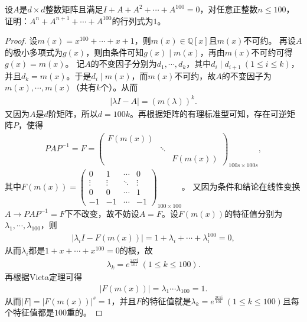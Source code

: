 \documentclass[../../main.tex]{subfiles}
\begin{document}
\begin{example}
设$A$是$d\times d$整数矩阵且满足$I + A + A^2 + \cdots + A^{100} = 0$，对任意正整数$n \leqslant  100$，证明：$A^n + A^{n + 1} + \cdots + A^{100}$的行列式为$1$。 
\end{example}
\begin{proof}
设$m(x) = x^{100}+\cdots + x + 1$，则$m(x)\in \mathbb{Q}[x]$且$m(x)$不可约。
再设$A$的极小多项式为$g(x)$，则由条件可知$g(x)\mid m(x)$，再由$m(x)$不可约可得$g(x)=m(x)$。
记$A$的不变因子分别为$d_1,\cdots,d_k$，其中$d_i\mid d_{i + 1}\ (1\leqslant i\leqslant k)$，并且$d_k = m(x)$。于是$d_i\mid m(x)$，而$m(x)$不可约，故$A$的不变因子为$m(x),\cdots,m(x)$（共有$k$个）。从而
\begin{align*}
|\lambda I - A| = (m(\lambda))^k.
\end{align*}
又因为$A$是$d$阶矩阵，所以$d = 100k$。再根据矩阵的有理标准型可知，存在可逆矩阵$P$，使得
\begin{align*}
PAP^{-1} = F = \begin{pmatrix}
F(m(x)) & & \\
& \ddots & \\
& & F(m(x))
\end{pmatrix}_{100s\times 100s},
\end{align*}
其中$F(m(x)) = \begin{pmatrix}
0 & 1 & \cdots & 0 \\
\vdots & \vdots & \ddots & \vdots \\
0 & 0 & \cdots & 1 \\
-1 & -1 & \cdots & -1
\end{pmatrix}_{100\times 100}$。
又因为条件和结论在线性变换$A\rightarrow PAP^{-1}=F$下不改变，故不妨设$A = F$。设$F(m(x))$的特征值分别为$\lambda_1,\cdots,\lambda_{100}$，则
\begin{align*}
|\lambda_i I - F(m(x))| = 1 + \lambda_i + \cdots + \lambda_i^{100} = 0,
\end{align*}
从而$\lambda_i$都是$1 + x + \cdots + x^{100} = 0$的根，故
\begin{align}
\lambda_k = e^{\frac{2k\pi \mathrm{i}}{101}}\ (1\leqslant k\leqslant 100). \label{100.50}
\end{align}
再根据Vieta定理可得
\begin{align*}
|F(m(x))| = \lambda_1\cdots \lambda_{100} = 1.
\end{align*}
从而$|F| = |F(m(x))|^s = 1$，并且$F$的特征值就是$\lambda_k = e^{\frac{2k\pi \mathrm{i}}{101}}\ (1\leqslant k\leqslant 100)$且每个特征值都是$100$重的。


\end{proof}
\end{document}
